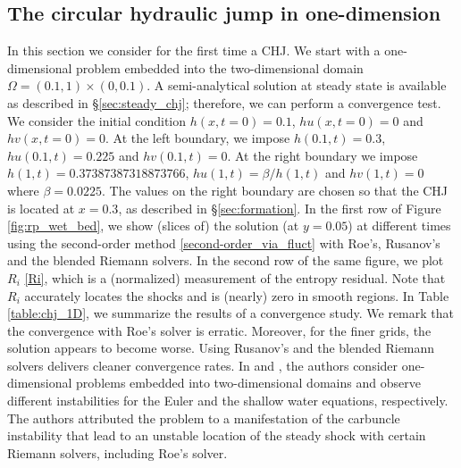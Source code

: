 \documentclass[preprint, 11pt]{article}
\begin{document}
\subsection{The circular hydraulic jump in one-dimension}\label{sec:1D_chj}
In this section we consider for the first time a CHJ. We start with a one-dimensional problem
embedded into the two-dimensional domain $\Omega=(0.1,1)\times(0,0.1)$.
A semi-analytical solution at steady state is available as described in \S \ref{sec:steady_chj};
therefore, we can perform a convergence test. 
We consider the initial condition $h(x,t=0)=0.1$, $hu(x,t=0)=0$ and $hv(x,t=0)=0$.
At the left boundary, we impose $h(0.1,t)=0.3$, $hu(0.1,t)=0.225$ and $hv(0.1,t)=0$.
At the right boundary we impose $h(1,t)=0.37387387318873766$, $hu(1,t)=\beta/h(1,t)$ and $hv(1,t)=0$ where $\beta=0.0225$.
The values on the right boundary are chosen so that the CHJ is located at $x=0.3$, as described in \S \ref{sec:formation}.
%
In the first row of Figure \ref{fig:rp_wet_bed}, we show (slices of) the solution (at $y=0.05$)
at different times using the second-order method \eqref{second-order_via_fluct} with Roe's, Rusanov's and the blended Riemann solvers. 
In the second row of the same figure, we plot $R_i$ \eqref{Ri}, which is a (normalized) measurement of the
entropy residual. Note that $R_i$ accurately locates the shocks and is (nearly) zero in smooth regions. 
In Table \ref{table:chj_1D}, we summarize the results of a convergence study. 
We remark that the convergence with Roe's solver is erratic.
Moreover, for the finer grids, the solution appears to become worse.
Using Rusanov's and the blended Riemann solvers delivers cleaner convergence rates. 
In \cite[\S 5]{kemm2018heuristical} and \cite{bader2014carbuncle}, the authors consider one-dimensional problems embedded into
two-dimensional domains and observe different instabilities for the
Euler and the shallow water equations, respectively.
The authors attributed the problem to a manifestation of the carbuncle instability
that lead to an unstable location of the steady shock with certain Riemann solvers, including Roe's solver. 
\end{document}
